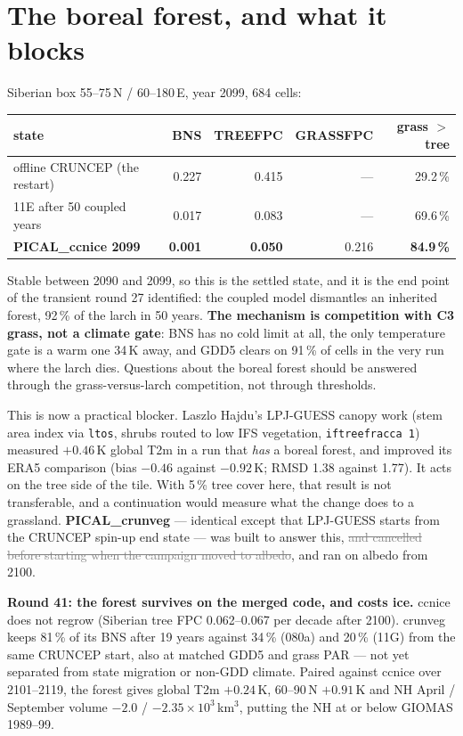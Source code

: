 \documentclass[10pt]{article}
\newcommand{\dead}[1]{\textcolor{gray}{\sout{#1}}}
\begin{document}
\section{The boreal forest, and what it blocks}\label{sec:boreal}

Siberian box 55--75\,N / 60--180\,E, year 2099, 684 cells:

\begin{center}\small
\begin{tabular}{lrrrr}
\toprule
state & BNS & TREEFPC & GRASSFPC & grass $>$ tree \\
\midrule
offline CRUNCEP (the restart)   & 0.227 & 0.415 & --- & 29.2\,\% \\
11E after 50 coupled years      & 0.017 & 0.083 & --- & 69.6\,\% \\
\textbf{PICAL\_ccnice 2099}     & \textbf{0.001} & \textbf{0.050} & 0.216 & \textbf{84.9\,\%} \\
\bottomrule
\end{tabular}
\end{center}

Stable between 2090 and 2099, so this is the settled state, and it is the end point of the
transient round 27 identified: the coupled model dismantles an inherited forest, 92\,\% of
the larch in 50 years. \textbf{The mechanism is competition with C3 grass, not a climate
gate}: BNS has no cold limit at all, the only temperature gate is a warm one 34\,K away,
and GDD5 clears on 91\,\% of cells in the very run where the larch dies. Questions about the
boreal forest should be answered through the grass-versus-larch competition, not through
thresholds.

This is now a practical blocker. Laszlo Hajdu's LPJ-GUESS canopy work (stem area index via
\texttt{ltos}, shrubs routed to low IFS vegetation, \texttt{iftreefracca 1}) measured
$+0.46$\,K global T2m in a run that \emph{has} a boreal forest, and improved its ERA5
comparison (bias $-0.46$ against $-0.92$\,K; RMSD 1.38 against 1.77). It acts on the tree
side of the tile. With 5\,\% tree cover here, that result is not transferable, and a
continuation would measure what the change does to a grassland.
\textbf{PICAL\_crunveg} --- identical except that LPJ-GUESS starts from the CRUNCEP
spin-up end state --- was built to answer this, \dead{and cancelled before starting when the
campaign moved to albedo}, and ran on albedo from 2100.

\textbf{Round 41: the forest survives on the merged code, and costs ice.} ccnice does not regrow
(Siberian tree FPC 0.062--0.067 per decade after 2100). crunveg keeps 81\,\% of its BNS after 19
years against 34\,\% (080a) and 20\,\% (11G) from the same CRUNCEP start, also at matched GDD5 and
grass PAR --- not yet separated from state migration or non-GDD climate. Paired against ccnice over
2101--2119, the forest gives global T2m $+0.24$\,K, 60--90\,N $+0.91$\,K and NH April / September
volume $-2.0$ / $-2.35\times10^3$\,km$^3$, putting the NH at or below GIOMAS 1989--99.
\end{document}
